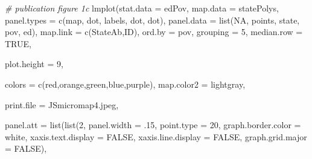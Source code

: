 \documentclass[
]{krantz}
\makeatletter
\newenvironment{Shaded}{\begin{snugshade}}{\end{snugshade}}
\newcommand{\AttributeTok}[1]{\textcolor[rgb]{0.61,0.61,0.61}{#1}}
\newcommand{\CommentTok}[1]{\textcolor[rgb]{0.37,0.37,0.37}{\textit{#1}}}
\newcommand{\ConstantTok}[1]{\textcolor[rgb]{0,0,0}{#1}}
\newcommand{\DecValTok}[1]{\textcolor[rgb]{0.06,0.06,0.06}{#1}}
\newcommand{\FunctionTok}[1]{\textcolor[rgb]{0,0,0}{#1}}
\newcommand{\NormalTok}[1]{#1}
\newcommand{\StringTok}[1]{\textcolor[rgb]{0.5,0.5,0.5}{#1}}
\newenvironment{kframe}{%
\medskip{}
\setlength{\fboxsep}{.8em}
 \def\at@end@of@kframe{}%
 \ifinner\ifhmode%
  \def\at@end@of@kframe{\end{minipage}}%
  \begin{minipage}{\columnwidth}%
 \fi\fi%
 \def\FrameCommand##1{\hskip\@totalleftmargin \hskip-\fboxsep
 \colorbox{shadecolor}{##1}\hskip-\fboxsep
     \hskip-\linewidth \hskip-\@totalleftmargin \hskip\columnwidth}%
 \MakeFramed {\advance\hsize-\width
   \@totalleftmargin\z@ \linewidth\hsize
   \@setminipage}}%
 {\par\unskip\endMakeFramed%
 \at@end@of@kframe}
\renewenvironment{Shaded}{\begin{kframe}}{\end{kframe}}
\makeatother
\begin{document}
\begin{Shaded}
\begin{Highlighting}[]
\CommentTok{\# publication figure 1c}
\FunctionTok{lmplot}\NormalTok{(}\AttributeTok{stat.data =}\NormalTok{ edPov, }\AttributeTok{map.data =}\NormalTok{ statePolys,}
    \AttributeTok{panel.types =} \FunctionTok{c}\NormalTok{(}\StringTok{\textquotesingle{}map\textquotesingle{}}\NormalTok{, }\StringTok{\textquotesingle{}dot\textquotesingle{}}\NormalTok{,  }\StringTok{\textquotesingle{}labels\textquotesingle{}}\NormalTok{, }\StringTok{\textquotesingle{}dot\textquotesingle{}}\NormalTok{, }\StringTok{\textquotesingle{}dot\textquotesingle{}}\NormalTok{),}
    \AttributeTok{panel.data =} \FunctionTok{list}\NormalTok{(}\ConstantTok{NA}\NormalTok{, }\StringTok{\textquotesingle{}points\textquotesingle{}}\NormalTok{, }\StringTok{\textquotesingle{}state\textquotesingle{}}\NormalTok{, }\StringTok{\textquotesingle{}pov\textquotesingle{}}\NormalTok{, }\StringTok{\textquotesingle{}ed\textquotesingle{}}\NormalTok{),}
    \AttributeTok{map.link =} \FunctionTok{c}\NormalTok{(}\StringTok{\textquotesingle{}StateAb\textquotesingle{}}\NormalTok{,}\StringTok{\textquotesingle{}ID\textquotesingle{}}\NormalTok{),}
    \AttributeTok{ord.by =} \StringTok{\textquotesingle{}pov\textquotesingle{}}\NormalTok{, }
    \AttributeTok{grouping =} \DecValTok{5}\NormalTok{, }
    \AttributeTok{median.row =} \ConstantTok{TRUE}\NormalTok{,}

    \AttributeTok{plot.height =} \DecValTok{9}\NormalTok{, }
    
    \AttributeTok{colors =} \FunctionTok{c}\NormalTok{(}\StringTok{\textquotesingle{}red\textquotesingle{}}\NormalTok{,}\StringTok{\textquotesingle{}orange\textquotesingle{}}\NormalTok{,}\StringTok{\textquotesingle{}green\textquotesingle{}}\NormalTok{,}\StringTok{\textquotesingle{}blue\textquotesingle{}}\NormalTok{,}\StringTok{\textquotesingle{}purple\textquotesingle{}}\NormalTok{),}
    \AttributeTok{map.color2 =} \StringTok{\textquotesingle{}lightgray\textquotesingle{}}\NormalTok{, }
    
    \AttributeTok{print.file =} \StringTok{\textquotesingle{}JSmicromap4.jpeg\textquotesingle{}}\NormalTok{,}

    \AttributeTok{panel.att =} \FunctionTok{list}\NormalTok{(}\FunctionTok{list}\NormalTok{(}\DecValTok{2}\NormalTok{, }\AttributeTok{panel.width =}\NormalTok{ .}\DecValTok{15}\NormalTok{, }\AttributeTok{point.type =} \DecValTok{20}\NormalTok{,}
                \AttributeTok{graph.border.color =} \StringTok{\textquotesingle{}white\textquotesingle{}}\NormalTok{,}
                \AttributeTok{xaxis.text.display =} \ConstantTok{FALSE}\NormalTok{, }\AttributeTok{xaxis.line.display =} \ConstantTok{FALSE}\NormalTok{,}
                \AttributeTok{graph.grid.major =} \ConstantTok{FALSE}\NormalTok{),}


\end{Highlighting}
\end{Shaded}
\end{document}
